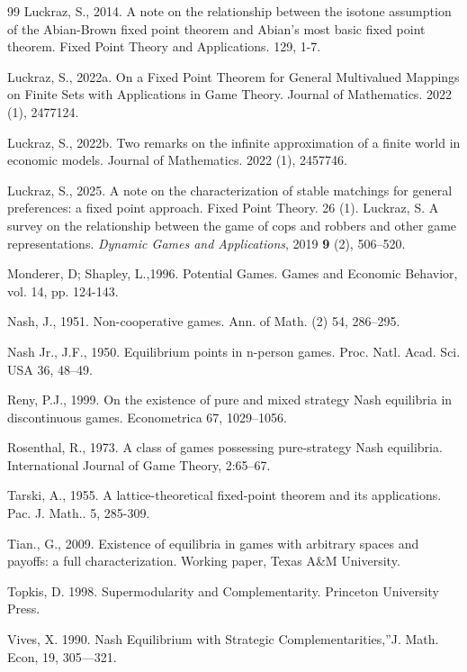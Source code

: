 \documentclass[11pt]{article}
\begin{document}
\begin{thebibliography}{99}
 Luckraz, S., 2014. A note on the relationship between the isotone assumption of the Abian-Brown fixed point theorem and Abian's most basic fixed point theorem. Fixed Point Theory and Applications. 129, 1-7.

 Luckraz, S., 2022a. On a Fixed Point Theorem for General Multivalued Mappings on Finite Sets with Applications in Game Theory. Journal of Mathematics. 2022 (1), 2477124.

 Luckraz, S., 2022b. Two remarks on the infinite approximation of a finite world in economic models. Journal of Mathematics. 2022 (1), 2457746.

 Luckraz, S., 2025. A note on the characterization of stable matchings for general preferences: a fixed point approach. Fixed Point Theory.
 26 (1).
Luckraz, S.
\newblock A survey on the relationship between the game of cops and robbers and other game representations.
\newblock \textit{Dynamic Games and Applications}, 2019 \textbf{9} (2), 506--520.

Monderer, D; Shapley, L.,1996. Potential Games. Games and
Economic Behavior, vol. 14, pp. 124-143.

Nash, J., 1951. Non-cooperative games. Ann. of Math. (2) 54, 286--295.

Nash Jr., J.F., 1950. Equilibrium points in n-person games.
Proc. Natl. Acad. Sci. USA 36, 48--49.

Reny, P.J., 1999. On the existence of pure and mixed strategy
Nash equilibria in discontinuous games. Econometrica 67, 1029--1056.

Rosenthal, R., 1973. A class of games possessing pure-strategy
Nash equilibria. International Journal of Game Theory, 2:65--67.

Tarski, A., 1955. A lattice-theoretical fixed-point theorem and
its applications. Pac. J. Math.. 5, 285-309.

Tian., G., 2009. Existence of equilibria in games with
arbitrary spaces and payoffs: a full characterization. Working paper, Texas
A\&M University.

Topkis, D. 1998. Supermodularity and Complementarity.
Princeton University Press.

Vives, X. 1990. Nash Equilibrium with Strategic
Complementarities,\textquotedblright J. Math. Econ, 19, 305---321.
\end{thebibliography}
\appendix
\end{document}
